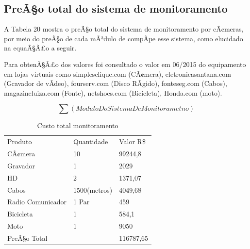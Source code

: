 \subsection{PreÃ§o total do sistema de monitoramento}

A Tabela 20 mostra o preÃ§o total do sistema de monitoramento por cÃ¢meras, por meio do preÃ§o de cada mÃ³dulo de compÃµe esse sistema, como elucidado na equaÃ§Ã£o a seguir.

Para obtenÃ§Ã£o dos valores foi consultado o valor em 06/2015 do equipamento em lojas virtuais como simplesclique.com (CÃ¢mera), eletronicasantana.com (Gravador de vÃ­deo), fourserv.com (Disco RÃ­gido), fonteseg.com (Cabos), magazineluiza.com (Fonte), netshoes.com (Bicicleta), Honda.com (moto).

\begin{equation}
	\sum (Modulo Do Sistema De Monitorametno)
\end{equation}
 
\begin{table}[h]
\centering
\caption{Custo total monitoramento}
\label{Custo total monitoramento}
\begin{tabular}{llll}
 &  &  &  \\ \hline
\multicolumn{1}{|l|}{Produto} & \multicolumn{1}{l|}{Quantidade} & \multicolumn{2}{l|}{Valor R\$} \\ \hline
\multicolumn{1}{|l|}{CÃ¢mera} & \multicolumn{1}{l|}{10} & \multicolumn{2}{l|}{99244,8} \\ \hline
\multicolumn{1}{|l|}{Gravador} & \multicolumn{1}{l|}{1} & \multicolumn{2}{l|}{2029} \\ \hline
\multicolumn{1}{|l|}{HD} & \multicolumn{1}{l|}{2} & \multicolumn{2}{l|}{1371,07} \\ \hline
\multicolumn{1}{|l|}{Cabos} & \multicolumn{1}{l|}{1500(metros)} & \multicolumn{2}{l|}{4049,68} \\ \hline
\multicolumn{1}{|l|}{Radio Comunicador} & \multicolumn{1}{l|}{1 Par} & \multicolumn{2}{l|}{459} \\ \hline
\multicolumn{1}{|l|}{Bicicleta} & \multicolumn{1}{l|}{1} & \multicolumn{2}{l|}{584,1} \\ \hline
\multicolumn{1}{|l|}{Moto} & \multicolumn{1}{l|}{1} & \multicolumn{2}{l|}{9050} \\ \hline
\multicolumn{2}{|l|}{PreÃ§o Total} & \multicolumn{2}{l|}{116787,65} \\ \hline
\end{tabular}
\end{table}

